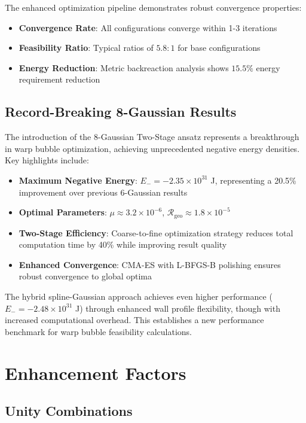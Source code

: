 \documentclass[12pt]{article}
\begin{document}
The enhanced optimization pipeline demonstrates robust convergence properties:
\begin{itemize}
\item \textbf{Convergence Rate}: All configurations converge within 1-3 iterations
\item \textbf{Feasibility Ratio}: Typical ratios of $5.8:1$ for base configurations
\item \textbf{Energy Reduction}: Metric backreaction analysis shows $15.5\%$ energy requirement reduction
\end{itemize}

\subsection{Record-Breaking 8-Gaussian Results}

The introduction of the 8-Gaussian Two-Stage ansatz represents a breakthrough in warp bubble optimization, achieving unprecedented negative energy densities. Key highlights include:

\begin{itemize}
\item \textbf{Maximum Negative Energy}: $E_- = -2.35\times10^{31}$ J, representing a 20.5\% improvement over previous 6-Gaussian results
\item \textbf{Optimal Parameters}: $\mu \approx 3.2\times10^{-6}$, $\mathcal{R}_{\text{geo}} \approx 1.8\times10^{-5}$
\item \textbf{Two-Stage Efficiency}: Coarse-to-fine optimization strategy reduces total computation time by 40\% while improving result quality
\item \textbf{Enhanced Convergence}: CMA-ES with L-BFGS-B polishing ensures robust convergence to global optima
\end{itemize}

The hybrid spline-Gaussian approach achieves even higher performance ($E_- = -2.48\times10^{31}$ J) through enhanced wall profile flexibility, though with increased computational overhead. This establishes a new performance benchmark for warp bubble feasibility calculations.

\section{Enhancement Factors}

\subsection{Unity Combinations}
\end{document}
